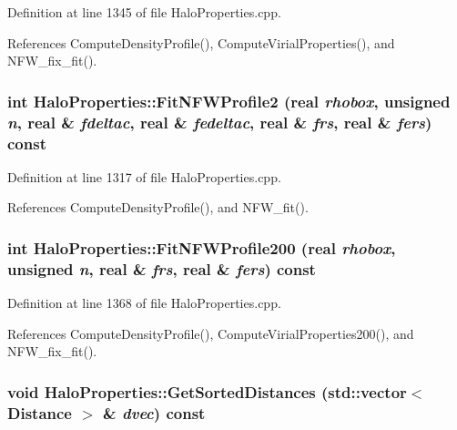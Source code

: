 Definition at line 1345 of file HaloProperties.cpp.



References ComputeDensityProfile(), ComputeVirialProperties(), and NFW\_\-fix\_\-fit().

\subsubsection[{FitNFWProfile2}]{\setlength{\rightskip}{0pt plus 5cm}int HaloProperties::FitNFWProfile2 ({\bf real} {\em rhobox}, \/  unsigned {\em n}, \/  {\bf real} \& {\em fdeltac}, \/  {\bf real} \& {\em fedeltac}, \/  {\bf real} \& {\em frs}, \/  {\bf real} \& {\em fers}) const}\label{classHaloProperties_adfcb17cd8afa75f87274f75a79e212a4}


Definition at line 1317 of file HaloProperties.cpp.



References ComputeDensityProfile(), and NFW\_\-fit().

\subsubsection[{FitNFWProfile200}]{\setlength{\rightskip}{0pt plus 5cm}int HaloProperties::FitNFWProfile200 ({\bf real} {\em rhobox}, \/  unsigned {\em n}, \/  {\bf real} \& {\em frs}, \/  {\bf real} \& {\em fers}) const}\label{classHaloProperties_a6c84410c43d8174b5cd61e728bb002c3}


Definition at line 1368 of file HaloProperties.cpp.



References ComputeDensityProfile(), ComputeVirialProperties200(), and NFW\_\-fix\_\-fit().

\subsubsection[{GetSortedDistances}]{\setlength{\rightskip}{0pt plus 5cm}void HaloProperties::GetSortedDistances (std::vector$<$ {\bf Distance} $>$ \& {\em dvec}) const}\label{classHaloProperties_a60b7ef82eee29ae676d28b9c819d1efb}


